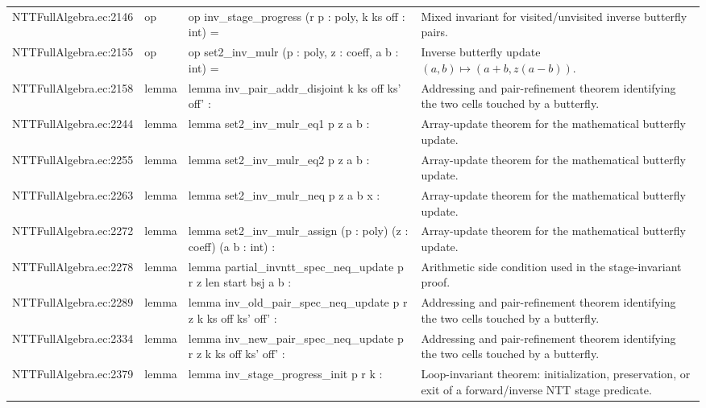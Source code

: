 \documentclass[10pt]{article}
\begin{document}
\begin{longtable}{L{0.11\textwidth}L{0.05\textwidth}L{0.38\textwidth}L{0.42\textwidth}}
NTTFullAlgebra.\allowbreak{}ec:\allowbreak{}2146 & op & {\ttfamily\scriptsize op inv\_stage\_progress (r p : poly, k ks off : int) =} & Mixed invariant for visited/unvisited inverse butterfly pairs. \\
NTTFullAlgebra.\allowbreak{}ec:\allowbreak{}2155 & op & {\ttfamily\scriptsize op set2\_inv\_mulr (p : poly, z : coeff, a b : int) =} & Inverse butterfly update $(a,b)\mapsto(a+b,z(a-b))$. \\
NTTFullAlgebra.\allowbreak{}ec:\allowbreak{}2158 & lemma & {\ttfamily\scriptsize lemma inv\_pair\_addr\_disjoint k ks off ks' off' :} & Addressing and pair-refinement theorem identifying the two cells touched by a butterfly. \\
NTTFullAlgebra.\allowbreak{}ec:\allowbreak{}2244 & lemma & {\ttfamily\scriptsize lemma set2\_inv\_mulr\_eq1 p z a b :} & Array-update theorem for the mathematical butterfly update. \\
NTTFullAlgebra.\allowbreak{}ec:\allowbreak{}2255 & lemma & {\ttfamily\scriptsize lemma set2\_inv\_mulr\_eq2 p z a b :} & Array-update theorem for the mathematical butterfly update. \\
NTTFullAlgebra.\allowbreak{}ec:\allowbreak{}2263 & lemma & {\ttfamily\scriptsize lemma set2\_inv\_mulr\_neq p z a b x :} & Array-update theorem for the mathematical butterfly update. \\
NTTFullAlgebra.\allowbreak{}ec:\allowbreak{}2272 & lemma & {\ttfamily\scriptsize lemma set2\_inv\_mulr\_assign (p : poly) (z : coeff) (a b : int) :} & Array-update theorem for the mathematical butterfly update. \\
NTTFullAlgebra.\allowbreak{}ec:\allowbreak{}2278 & lemma & {\ttfamily\scriptsize lemma partial\_invntt\_spec\_neq\_update p r z len start bsj a b :} & Arithmetic side condition used in the stage-invariant proof. \\
NTTFullAlgebra.\allowbreak{}ec:\allowbreak{}2289 & lemma & {\ttfamily\scriptsize lemma inv\_old\_pair\_spec\_neq\_update p r z k ks off ks' off' :} & Addressing and pair-refinement theorem identifying the two cells touched by a butterfly. \\
NTTFullAlgebra.\allowbreak{}ec:\allowbreak{}2334 & lemma & {\ttfamily\scriptsize lemma inv\_new\_pair\_spec\_neq\_update p r z k ks off ks' off' :} & Addressing and pair-refinement theorem identifying the two cells touched by a butterfly. \\
NTTFullAlgebra.\allowbreak{}ec:\allowbreak{}2379 & lemma & {\ttfamily\scriptsize lemma inv\_stage\_progress\_init p r k :} & Loop-invariant theorem: initialization, preservation, or exit of a forward/inverse NTT stage predicate. \\

\end{longtable}
\end{document}

